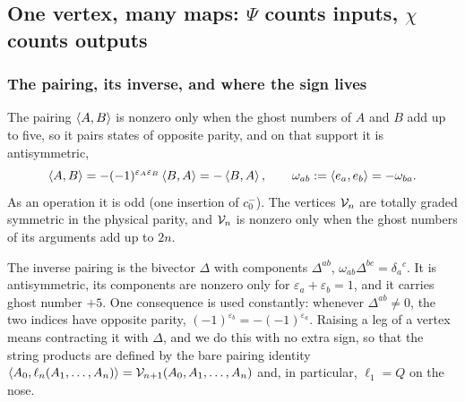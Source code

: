 \subsection{One vertex, many maps: \texorpdfstring{$\Psi$}{Psi} counts inputs, \texorpdfstring{$\chi$}{chi} counts outputs}
\label{ibk:sec:gen}

\subsubsection{The pairing, its inverse, and where the sign lives}
\label{ibk:sec:gen:pairing}

The pairing $\braket{A,B}$ is nonzero only when the ghost numbers of $A$ and $B$ add up to five, so it pairs states of opposite parity, and on that support it is antisymmetric,
\begin{equation}
  \label{ibk:eq:gen:omega}
  \braket{A,B}
    = -(-1)^{\varepsilon_A\varepsilon_B}\braket{B,A}
    = -\braket{B,A},
  \qquad
  \omega_{ab}
    := \braket{e_a,e_b}
    = -\omega_{ba}.
\end{equation}
As an operation it is odd (one insertion of $c_0^-$). The vertices ${\mathcal{V}}_n$ are totally graded symmetric in the physical parity, and ${\mathcal{V}}_n$ is nonzero only when the ghost numbers of its arguments add up to $2n$.

The inverse pairing is the bivector $\Delta$ with components $\Delta^{ab}$, $\omega_{ab}\Delta^{bc}=\delta_a{}^c$. It is antisymmetric, its components are nonzero only for $\varepsilon_a+\varepsilon_b=1$, and it carries ghost number $+5$. One consequence is used constantly: whenever $\Delta^{ab}\neq0$, the two indices have opposite parity, $(-1)^{\varepsilon_b}=-(-1)^{\varepsilon_a}$. Raising a leg of a vertex means contracting it with $\Delta$, and we do this with no extra sign, so that the string products are defined by the bare pairing identity $\braket{A_0,\ell_n(A_1,\dots,A_n)}={\mathcal{V}}_{n+1}(A_0,A_1,\dots,A_n)$ and, in particular, $\ell_1=Q$ on the nose.

